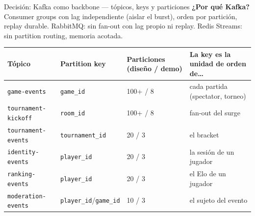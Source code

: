 \documentclass[aspectratio=169,10pt]{beamer}
\begin{document}
\begin{frame}{Decisión: Kafka como backbone --- tópicos, keys y particiones}
  \small
  \textbf{¿Por qué Kafka?} Consumer groups con lag independiente (aislar el burst),
  orden por partición, replay durable. RabbitMQ: sin fan-out con lag propio ni replay.
  Redis Streams: sin partition routing, memoria acotada.
  \vspace{2mm}
  \begin{center}\scriptsize
  \begin{tabular}{@{}llll@{}}
    \toprule
    Tópico & Partition key & Particiones (diseño / demo) & La key es la unidad de orden de\ldots \\
    \midrule
    \texttt{game-events}        & \texttt{game\_id}       & \alert{100+} / 8 & cada partida (spectator, torneo) \\
    \texttt{tournament-kickoff} & \texttt{room\_id}       & \alert{100+} / 8 & fan-out del surge \\
    \texttt{tournament-events}  & \texttt{tournament\_id} & 20 / 3  & el bracket \\
    \texttt{identity-events}    & \texttt{player\_id}     & 20 / 3  & la sesión de un jugador \\
    \texttt{ranking-events}     & \texttt{player\_id}     & 20 / 3  & el Elo de un jugador \\
    \texttt{moderation-events}  & \texttt{player\_id}/\texttt{game\_id} & 10 / 3 & el sujeto del evento \\
    \bottomrule
  \end{tabular}
  \end{center}
\end{frame}
\end{document}
